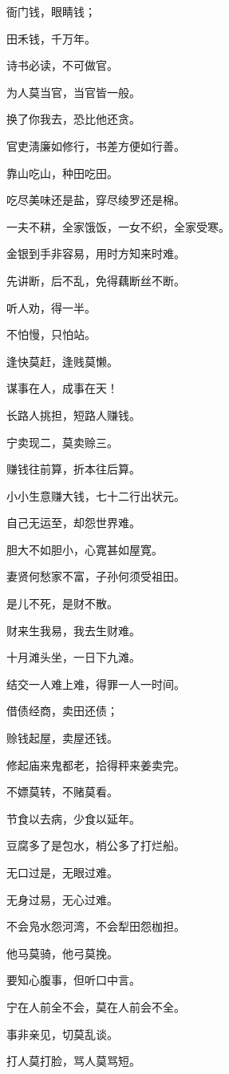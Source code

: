 \documentclass[12pt,oneside]{book}
\begin{document}
衙门钱，眼睛钱；

田禾钱，千万年。

诗书必读，不可做官。

为人莫当官，当官皆一般。

换了你我去，恐比他还贪。

官吏淸廉如修行，书差方便如行善。

靠山吃山，种田吃田。

吃尽美味还是盐，穿尽绫罗还是棉。

一夫不耕，全家饿饭，一女不织，全家受寒。

金银到手非容易，用时方知来时难。

先讲断，后不乱，免得藕断丝不断。

听人劝，得一半。

不怕慢，只怕站。

逢快莫赶，逢贱莫懒。

谋事在人，成事在天！

长路人挑担，短路人赚钱。

宁卖现二，莫卖赊三。

赚钱往前算，折本往后算。

小小生意赚大钱，七十二行出状元。

自己无运至，却怨世界难。

胆大不如胆小，心寛甚如屋寛。

妻贤何愁家不富，子孙何须受祖田。

是儿不死，是财不散。

财来生我易，我去生财难。

十月滩头坐，一日下九滩。

结交一人难上难，得罪一人一时间。

借债经商，卖田还债；

赊钱起屋，卖屋还钱。

修起庙来鬼都老，拾得秤来姜卖完。

不嫖莫转，不赌莫看。

节食以去病，少食以延年。

豆腐多了是包水，梢公多了打烂船。

无口过是，无眼过难。

无身过易，无心过难。

不会凫水怨河湾，不会犁田怨枷担。

他马莫骑，他弓莫挽。

要知心腹事，但听口中言。

宁在人前全不会，莫在人前会不全。

事非亲见，切莫乱谈。

打人莫打脸，骂人莫骂短。
\end{document}
